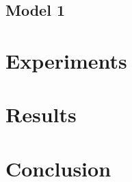 \documentclass[11pt,twocolumn,DIV=11]{scrartcl}
\begin{document}
\subsection{Model 1}



\section{Experiments}
\label{experiments}

\section{Results}
\label{results}

\section{Conclusion}
\label{conclusion}



\end{document}
